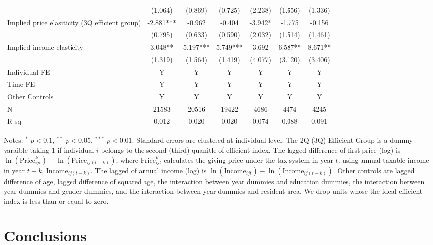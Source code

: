 \documentclass[ review  , 3p ]{elsarticle}
\begin{document}
\begin{table}
\begin{threeparttable}
\begin{tabular}[t]{lcccccc}
   & (1.064) & (0.869) & (0.725) & (2.238) & (1.656) & (1.336)\\
  Implied price elasiticity (3Q efficient group) & -2.881*** & -0.962 & -0.404 & -3.942* & -1.775 & -0.156\\
   & (0.795) & (0.633) & (0.590) & (2.032) & (1.514) & (1.461)\\
  Implied income elasticity & 3.048** & 5.197*** & 5.749*** & 3.692 & 6.587** & 8.671**\\
   & (1.319) & (1.564) & (1.419) & (4.077) & (3.120) & (3.406)\\
  Individual FE & Y & Y & Y & Y & Y & Y\\
  Time FE & Y & Y & Y & Y & Y & Y\\
  Other Controls & Y & Y & Y & Y & Y & Y\\
  N & 21583 & 20516 & 19422 & 4686 & 4474 & 4245\\
  R-sq & 0.012 & 0.020 & 0.020 & 0.074 & 0.088 & 0.091\\
  \bottomrule
  \end{tabular}
  \begin{tablenotes}
  \item Notes: $^{*}$ $p < 0.1$, $^{**}$ $p < 0.05$, $^{***}$ $p < 0.01$. Standard errors are clustered at individual level. The 2Q (3Q) Efficient Group is a dummy varaible taking 1 if individual $i$ belongs to the second (third) quanitle of efficient index. The lagged difference of first price (log) is $\ln(\text{Price}^k_{ijt}) - \ln(\text{Price}_{ij(t-k)})$, where $\text{Price}^k_{ijt}$ calculates the giving price under the tax system in year $t$, using annual taxable income in year $t-k$, $\text{Income}_{ij(t-k)}$. The lagged of annual income (log) is $\ln(\text{Income}_{ijt}) - \ln(\text{Income}_{ij(t-k)})$. Other controls are lagged difference of age, lagged difference of squared age, the interaction between year dummies and education dummies, the interaction between year dummies and gender dummies, and the interaction between year dummies and resident area. We drop units whose the ideal efficient index is less than or equal to zero.
  \end{tablenotes}
  \end{threeparttable}
  \end{table}
  
  \hypertarget{conclusions}{%
  \section{Conclusions}\label{conclusions}}
  
\end{document}
